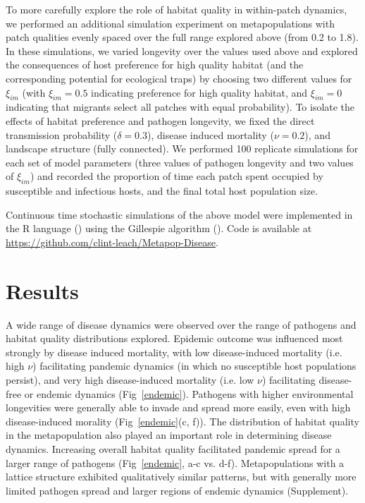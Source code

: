 \documentclass{article}
\begin{document}
To more carefully explore the role of habitat quality in within-patch dynamics, we performed an additional simulation experiment on metapopulations with patch qualities evenly spaced over the full range explored above (from 0.2 to 1.8).
In these simulations, we varied longevity over the values used above and explored the consequences of host preference for high quality habitat (and the corresponding potential for ecological traps) by choosing two different values for $\xi_{im}$ (with $\xi_{im} = 0.5$ indicating preference for high quality habitat, and  $\xi_{im} = 0$ indicating that migrants select all patches with equal probability).  
To isolate the effects of habitat preference and pathogen longevity, we fixed the direct transmission probability ($\delta = 0.3$), disease induced mortality ($\nu = 0.2$), and landscape structure (fully connected).
We performed 100 replicate simulations for each set of model parameters (three values of pathogen longevity and two values of $\xi_{im}$) and recorded the proportion of time each patch spent occupied by susceptible and infectious hosts, and the final total host population size.

Continuous time stochastic simulations of the above model were implemented in the R language (\cite{R2014}) using the Gillespie algorithm (\cite{Gillespie1977}).  Code is available at \url{https://github.com/clint-leach/Metapop-Disease}.

\section{Results}
\label{results}

A wide range of disease dynamics were observed over the range of pathogens and habitat quality distributions explored.  
Epidemic outcome was influenced most strongly by disease induced mortality, with low disease-induced mortality (i.e. high $\nu$) facilitating pandemic dynamics (in which no susceptible host populations persist), and very high disease-induced mortality (i.e. low $\nu$) facilitating disease-free or endemic dynamics (Fig~\ref{endemic}). 
Pathogens with higher environmental longevities were generally able to invade and spread more easily, even with high disease-induced morality (Fig~\ref{endemic}(c, f)).  
The distribution of habitat quality in the metapopulation also played an important role in determining disease dynamics.  Increasing overall habitat quality facilitated pandemic spread for a larger range of pathogens (Fig~\ref{endemic}, a-c vs. d-f).
Metapopulations with a lattice structure exhibited qualitatively similar patterns, but with generally more limited pathogen spread and larger regions of endemic dynamics (Supplement).
\end{document}
